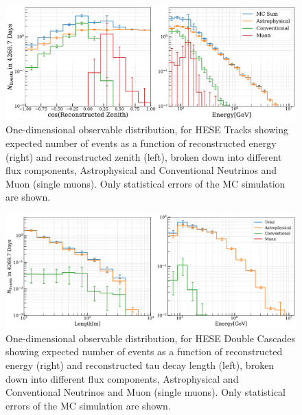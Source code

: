 \begin{figure}[h!]
    \caption[1D observable distribution of the total deposited energy and zenith angle for tracks]{One-dimensional observable distribution, for HESE Tracks showing expected number of events as a function of reconstructed energy (right) and reconstructed zenith (left), broken down into different flux components, Astrophysical and Conventional Neutrinos and Muon (single muons). Only statistical errors of the MC simulation are shown.}
    \includegraphics{./figures/Analysis/Tracks.pdf}
\end{figure}

\begin{figure}[h!]
    \caption[1D observable distribution of the total deposited energy and reconstructed tau decay length for double cascades]{One-dimensional observable distribution, for HESE Double Cascades showing expected number of events as a function of reconstructed energy (right) and reconstructed tau decay length (left), broken down into different flux components, Astrophysical and Conventional Neutrinos and Muon (single muons). Only statistical errors of the MC simulation are shown.}
    \includegraphics{./figures/Analysis/Double.pdf}
\end{figure}

